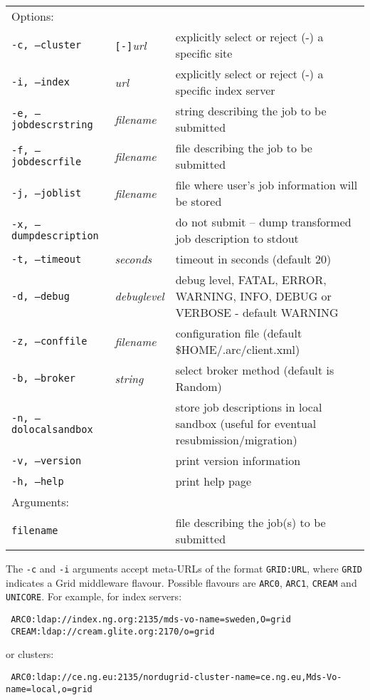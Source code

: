\hspace*{0.5cm}
\begin{shaded}
\end{shaded}
\begin{longtable}{llp{8cm}}
   Options:&&\\
   \texttt{-c, --cluster}&\verb#[-]#\textit{url}&explicitly select or reject (-) a specific site\\
   \texttt{-i, --index}&\textit{url}&explicitly select or reject (-) a specific index server\\
   \texttt{-e, --jobdescrstring}&\textit{filename}&string describing the job to be submitted\\
   \texttt{-f, --jobdescrfile}&\textit{filename}&file describing the job to be submitted\\
   \texttt{-j, --joblist}&\textit{filename}&file where user's job information will be stored\\
   \texttt{-x, --dumpdescription}&&do not submit -- dump transformed job description to stdout\\
   \texttt{-t, --timeout}&\textit{seconds}&timeout in seconds (default 20)\\
   \texttt{-d, --debug}&\textit{debuglevel}&debug level, FATAL, ERROR, WARNING, INFO, DEBUG or VERBOSE - default WARNING\\
   \texttt{-z, --conffile}&\textit{filename}& configuration file (default {\$}HOME/.arc/client.xml)\\
   \texttt{-b, --broker}&\textit{string}&select broker method (default is Random)\\
   \texttt{-n, --dolocalsandbox}& &store job descriptions in local sandbox (useful for eventual resubmission/migration)\\
   \texttt{-v, --version}&&print version information\\
   \texttt{-h, --help}&&print help page\\
   Arguments:&&\\
   \texttt{filename}&&file describing the job(s) to be submitted\\
\end{longtable}

\begin{framed}
The \verb#-c# and \verb#-i# arguments accept meta-URLs of the format \texttt{GRID:URL}, where \texttt{GRID} indicates a Grid middleware flavour. Possible flavours are \texttt{ARC0}, \texttt{ARC1}, \texttt{CREAM} and \texttt{UNICORE}. For example, for index servers:
\begin{verbatim}
 ARC0:ldap://index.ng.org:2135/mds-vo-name=sweden,O=grid
 CREAM:ldap://cream.glite.org:2170/o=grid
\end{verbatim}
or clusters:

\verb# ARC0:ldap://ce.ng.eu:2135/nordugrid-cluster-name=ce.ng.eu,Mds-Vo-name=local,o=grid#
\end{framed}

